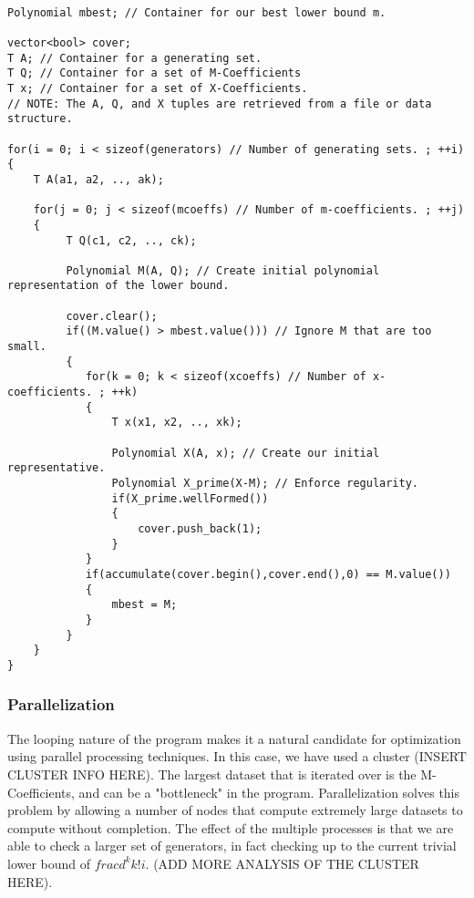 \begin{lstlisting}

Polynomial mbest; // Container for our best lower bound m.

vector<bool> cover;
T A; // Container for a generating set.
T Q; // Container for a set of M-Coefficients
T x; // Container for a set of X-Coefficients.
// NOTE: The A, Q, and X tuples are retrieved from a file or data structure.

for(i = 0; i < sizeof(generators) // Number of generating sets. ; ++i)
{
    T A(a1, a2, .., ak);

    for(j = 0; j < sizeof(mcoeffs) // Number of m-coefficients. ; ++j)
    {
         T Q(c1, c2, .., ck); 
 
         Polynomial M(A, Q); // Create initial polynomial representation of the lower bound.
   
         cover.clear(); 
         if((M.value() > mbest.value())) // Ignore M that are too small.
         {
            for(k = 0; k < sizeof(xcoeffs) // Number of x-coefficients. ; ++k)
            {
                T x(x1, x2, .., xk);

                Polynomial X(A, x); // Create our initial representative.
                Polynomial X_prime(X-M); // Enforce regularity.
                if(X_prime.wellFormed())
                { 
                    cover.push_back(1);
                }
            }
            if(accumulate(cover.begin(),cover.end(),0) == M.value())
            {
                mbest = M;
            }
         }
    }
}

\end{lstlisting}

\subsubsection*{Parallelization}

The looping nature of the program makes it a natural candidate for optimization using parallel processing techniques. In this case, we have used a cluster (INSERT CLUSTER INFO HERE). The largest dataset that is iterated over is the M-Coefficients, and can be a "bottleneck" in the program. Parallelization solves this problem by allowing a number of nodes that compute extremely large datasets to compute without completion. The effect of the multiple processes is that we are able to check a larger set of generators, in fact checking up to the current trivial lower bound of $frac{d^k}{k!}i$. (ADD MORE ANALYSIS OF THE CLUSTER HERE).

